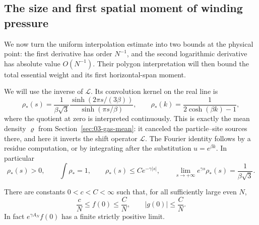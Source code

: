 \subsection{The size and first spatial moment of winding pressure}

We now turn the uniform interpolation estimate into two bounds at the
physical point: the first derivative has order \(N^{-1}\), and the
second logarithmic derivative has absolute value \(O(N^{-1})\).
Their polygon interpretation will then bound the total essential weight
and its first horizontal-span moment.

We will use the inverse of \(\mathscr L\). Its convolution kernel on the real line is
\begin{equation}
 \rho_*(s)=\frac1{\beta\sqrt3}
 \frac{\sinh(2\pi s/(3\beta))}{\sinh(\pi s/\beta)},
 \qquad
 \widehat{\rho_*}(k)=\frac1{2\cosh(\beta k)-1},
 \label{eq:05-resolvent}
\end{equation}
where the quotient at zero is interpreted continuously. This is exactly
the mean density \(\varrho\) from Section~\ref{sec:03-gas-mean}:
it canceled the particle--site sources there, and here it inverts
the shift operator \(\mathscr L\). The Fourier identity follows by a residue computation, or by integrating after the substitution \(u=e^{\beta k}\). In particular
\begin{equation}
 \rho_*(s)>0,\qquad \int\rho_*=1,\qquad
 \rho_*(s)\le Ce^{-\gamma|s|},\qquad
 \lim_{s\to+\infty}e^{\gamma s}\rho_*(s)=\frac1{\beta\sqrt3}.
 \label{eq:05-resolvent-tail}
\end{equation}

\begin{lemma}
\label{lem:05-pressure-bounds}
There are constants \(0<c<C<\infty\) such that, for all sufficiently large even \(N\),
\begin{equation}
 \frac cN\le f(0)\le\frac CN,
 \qquad |g(0)|\le\frac CN.
 \label{eq:05-winding-pressure}
\end{equation}
In fact \(e^{\gamma A_N}f(0)\) has a finite strictly positive limit.
\end{lemma}

